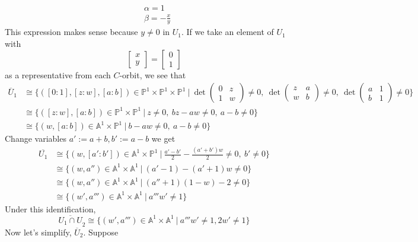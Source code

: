 \begin{example}
	\begin{align*}
		&\alpha=1\\
		&\beta=-\frac{x}{y}
	\end{align*}
This expression makes sense because $y\neq 0$ in $U_1$.
If we take an element of $U_1$ with 
\[
	\begin{bmatrix}
		x\\
		y
	\end{bmatrix}
	=
	\begin{bmatrix}
		0\\
		1
	\end{bmatrix}	
\]
as a representative from each $C$-orbit, we see that 
\begin{align*}
	\overline{U}_1
	&\cong
	\{
	([0:1],[z:w],[a:b])\in \mathbb{P}^1 \times \mathbb{P}^1\times \mathbb{P}^1~|~
	\operatorname{det}
	\begin{pmatrix}
	0&z\\
	1&w
	\end{pmatrix}
	\neq 0,~
	\operatorname{det}
	\begin{pmatrix}
	z&a\\
	w&b
	\end{pmatrix}
	\neq 0,~
	\operatorname{det}
	\begin{pmatrix}
	a&1\\
	b&1
	\end{pmatrix}
	\neq 0	 	
	\}	
	\\
	&\cong
	\{
	([z:w],[a:b])\in \mathbb{P}^1\times \mathbb{P}^1~|~
	z\neq 0,~
	bz-aw\neq 0,~
	a-b\neq 0	 	
	\}\\
	&\cong
	\{
	(w,[a:b])\in \mathbb{A}^1\times \mathbb{P}^1~|~
	b-aw\neq 0,~
	a-b\neq 0	 	
	\}	
\end{align*}
Change variables $a':=a+b,b':=a-b$ we get
\begin{align*}
	\overline{U_1}
	&\cong
	\{
	(w,[a':b'])\in \mathbb{A}^1\times \mathbb{P}^1~|~
	\frac{a'-b'}{2}-\frac{(a'+b')w}{2}\neq 0,~
	b'\neq 0	 	
	\}\\
	&\cong
	\{
	(w,a'')\in \mathbb{A}^1\times \mathbb{A}^1~|~
	(a'-1)-(a'+1)w\neq 0 	
	\}\\
	&\cong
	\{
	(w,a'')\in \mathbb{A}^1\times \mathbb{A}^1~|~
	(a''+1)(1-w)-2\neq 0 	
	\}\\
	&\cong
	\{
	(w',a''')\in \mathbb{A}^1\times \mathbb{A}^1~|~
	a'''w'\neq 1 	
	\}
\end{align*}
Under this identification,
\[
	\overline{U_1\cap U}_2
	\cong
	\{
	(w',a''')\in \mathbb{A}^1\times \mathbb{A}^1~|~
	a'''w'\neq 1, 2w'\neq 1 	
	\}
\]
Now let's simplify, $ \overline{U}_2 $. Suppose

\end{example}
